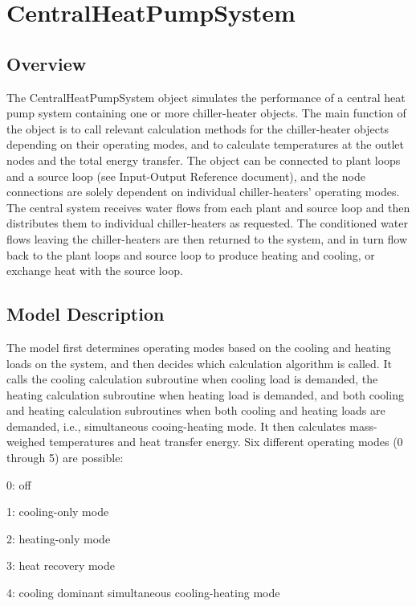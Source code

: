 \section{CentralHeatPumpSystem }\label{centralheatpumpsystem}

\subsection{Overview}\label{overview-007}

The CentralHeatPumpSystem object simulates the performance of a central heat pump system containing one or more chiller-heater objects. The main function of the object is to call relevant calculation methods for the chiller-heater objects depending on their operating modes, and to calculate temperatures at the outlet nodes and the total energy transfer. The object can be connected to plant loops and a source loop (see Input-Output Reference document), and the node connections are solely dependent on individual chiller-heaters' operating modes. The central system receives water flows from each plant and source loop and then distributes them to individual chiller-heaters as requested. The conditioned water flows leaving the chiller-heaters are then returned to the system, and in turn flow back to the plant loops and source loop to produce heating and cooling, or exchange heat with the source loop.

\subsection{Model Description}\label{model-description-004}

The model first determines operating modes based on the cooling and heating loads on the system, and then decides which calculation algorithm is called. It calls the cooling calculation subroutine when cooling load is demanded, the heating calculation subroutine when heating load is demanded, and both cooling and heating calculation subroutines when both cooling and heating loads are demanded, i.e., simultaneous cooing-heating mode. It then calculates mass-weighed temperatures and heat transfer energy. Six different operating modes (0 through 5) are possible:

0: off

1: cooling-only mode

2: heating-only mode

3: heat recovery mode

4: cooling dominant simultaneous cooling-heating mode

